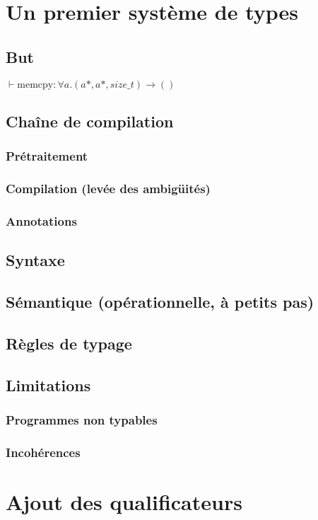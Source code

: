 \documentclass{phdthesis}
\begin{document}
\chapter{Un premier système de types}

\section{But}

$⊢ \text{memcpy} : ∀ a . (a*, a*, size\_t) → ()$

\section{Chaîne de compilation}
\subsection{Prétraitement}
\subsection{Compilation (levée des ambigüités)}
\subsection{Annotations}
\section{Syntaxe}
\section{Sémantique (opérationnelle, à petits pas)}
\section{Règles de typage}
\section{Limitations}
\subsection{Programmes non typables}
\subsection{Incohérences}

\chapter{Ajout des qualificateurs}
\end{document}
